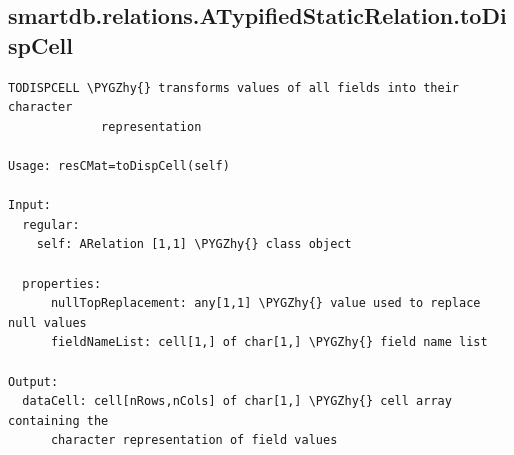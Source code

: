 \documentclass[letterpaper,10pt,english]{sphinxmanual}
\def\PYGZhy{\char`\-}
\begin{document}
\subsection{smartdb.relations.ATypifiedStaticRelation.toDispCell}
\label{chap_functions:smartdb-relations-atypifiedstaticrelation-todispcell}
\begin{Verbatim}[commandchars=\\\{\}]
TODISPCELL \PYGZhy{} transforms values of all fields into their character
             representation

Usage: resCMat=toDispCell(self)

Input:
  regular:
    self: ARelation [1,1] \PYGZhy{} class object

  properties:
      nullTopReplacement: any[1,1] \PYGZhy{} value used to replace null values
      fieldNameList: cell[1,] of char[1,] \PYGZhy{} field name list

Output:
  dataCell: cell[nRows,nCols] of char[1,] \PYGZhy{} cell array containing the
      character representation of field values
\end{Verbatim}
\end{document}
